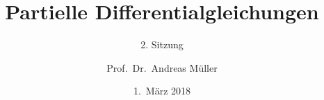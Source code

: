 \documentclass[handout]{beamer}
\title[]{Partielle Differentialgleichungen}
\subtitle{2. Sitzung}
\date[1.~März 2018]{1.~März 2018}
\author{Prof.~Dr.~Andreas Müller}
\begin{document}
\begin{frame}
\titlepage

\end{frame}


\end{document}
